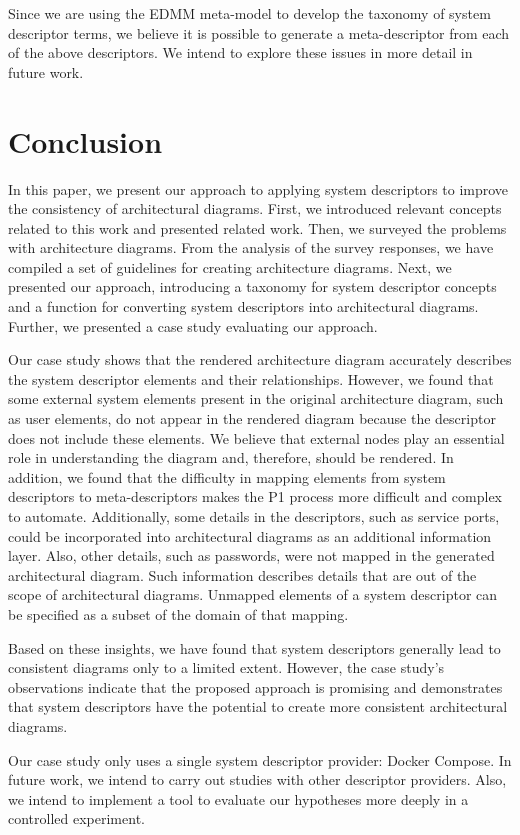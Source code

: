 \documentclass[sigconf]{acmart}
\begin{document}
Since we are using the EDMM meta-model to develop the taxonomy of system descriptor terms, we believe it is possible to generate a meta-descriptor from each of the above descriptors. We intend to explore these issues in more detail in future work.

\section{Conclusion}
\label{sec:conclusions}

In this paper, we present our approach to applying system descriptors to improve the consistency of architectural diagrams. First, we introduced relevant concepts related to this work and presented related work. Then, we surveyed the problems with architecture diagrams. From the analysis of the survey responses, we have compiled a set of guidelines for creating architecture diagrams. Next, we presented our approach, introducing a taxonomy for system descriptor concepts and a function for converting system descriptors into architectural diagrams. Further, we presented a case study evaluating our approach.

Our case study shows that the rendered architecture diagram accurately describes the system descriptor elements and their relationships. However, we found that some external system elements present in the original architecture diagram, such as user elements, do not appear in the rendered diagram because the descriptor does not include these elements. We believe that external nodes play an essential role in understanding the diagram and, therefore, should be rendered. In addition, we found that the difficulty in mapping elements from system descriptors to meta-descriptors makes the P1 process more difficult and complex to automate. Additionally, some details in the descriptors, such as service ports, could be incorporated into architectural diagrams as an additional information layer. Also, other details, such as passwords, were not mapped in the generated architectural diagram. Such information describes details that are out of the scope of architectural diagrams. Unmapped elements of a system descriptor can be specified as a subset of the domain of that mapping.

Based on these insights, we have found that system descriptors generally lead to consistent diagrams only to a limited extent. However, the case study's observations indicate that the proposed approach is promising and demonstrates that system descriptors have the potential to create more consistent architectural diagrams.

Our case study only uses a single system descriptor provider: Docker Compose. In future work, we intend to carry out studies with other descriptor providers. Also, we intend to implement a tool to evaluate our hypotheses more deeply in a controlled experiment.



\end{document}
